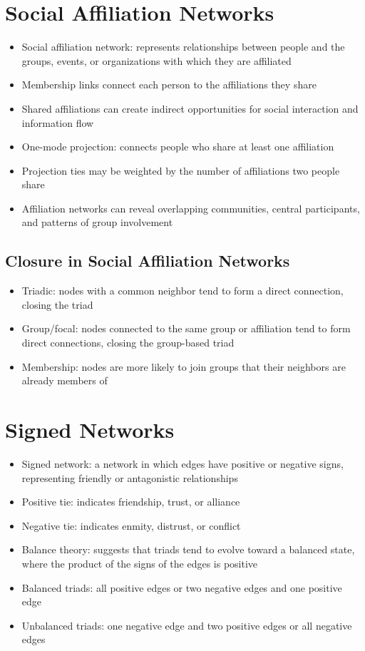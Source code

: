 \section{Social Affiliation Networks}
\begin{itemize}
  \item Social affiliation network: represents relationships between people and the groups, events, or organizations with which they are affiliated
  \item Membership links connect each person to the affiliations they share
  \item Shared affiliations can create indirect opportunities for social interaction and information flow
  \item One-mode projection: connects people who share at least one affiliation
  \item Projection ties may be weighted by the number of affiliations two people share
  \item Affiliation networks can reveal overlapping communities, central participants, and patterns of group involvement
\end{itemize}

\subsection{Closure in Social Affiliation Networks}

\begin{itemize}
  \item Triadic: nodes with a common neighbor tend to form a direct connection, closing the triad
  \item Group/focal: nodes connected to the same group or affiliation tend to form direct connections, closing the group-based triad
  \item Membership: nodes are more likely to join groups that their neighbors are already members of
\end{itemize}

\section{Signed Networks}

\begin{itemize}
  \item Signed network: a network in which edges have positive or negative signs, representing friendly or antagonistic relationships
  \item Positive tie: indicates friendship, trust, or alliance
  \item Negative tie: indicates enmity, distrust, or conflict
  \item Balance theory: suggests that triads tend to evolve toward a balanced state, where the product of the signs of the edges is positive
  \item Balanced triads: all positive edges or two negative edges and one positive edge
  \item Unbalanced triads: one negative edge and two positive edges or all negative edges
\end{itemize}